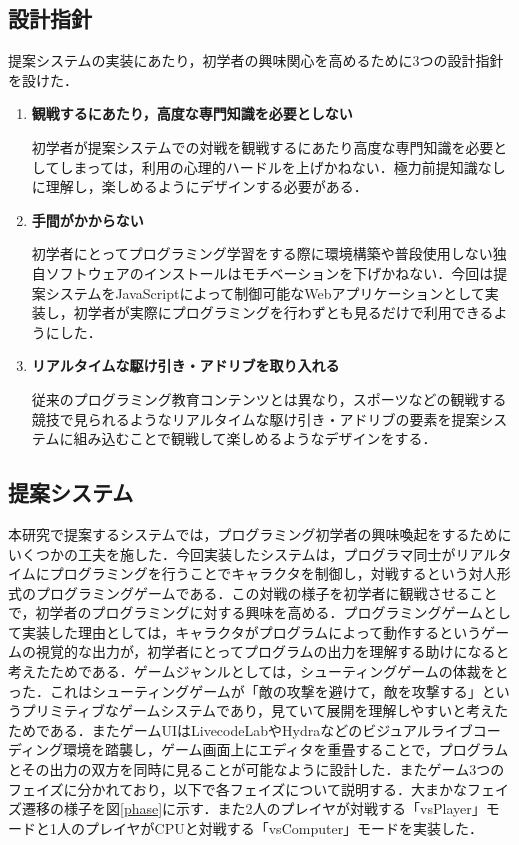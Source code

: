 \subsection{設計指針}

提案システムの実装にあたり，初学者の興味関心を高めるために3つの設計指針を設けた．

\begin{enumerate}
	\item {\bf 観戦するにあたり，高度な専門知識を必要としない}
	
	初学者が提案システムでの対戦を観戦するにあたり高度な専門知識を必要としてしまっては，利用の心理的ハードルを上げかねない．極力前提知識なしに理解し，楽しめるようにデザインする必要がある．
	
	\item {\bf 手間がかからない}

	初学者にとってプログラミング学習をする際に環境構築や普段使用しない独自ソフトウェアのインストールはモチベーションを下げかねない．今回は提案システムをJavaScriptによって制御可能なWebアプリケーションとして実装し，初学者が実際にプログラミングを行わずとも見るだけで利用できるようにした．
	
	\item {\bf リアルタイムな駆け引き・アドリブを取り入れる}

	従来のプログラミング教育コンテンツとは異なり，スポーツなどの観戦する競技で見られるようなリアルタイムな駆け引き・アドリブの要素を提案システムに組み込むことで観戦して楽しめるようなデザインをする．
\end{enumerate}

\subsection{提案システム}

本研究で提案するシステムでは，プログラミング初学者の興味喚起をするためにいくつかの工夫を施した．今回実装したシステムは，プログラマ同士がリアルタイムにプログラミングを行うことでキャラクタを制御し，対戦するという対人形式のプログラミングゲームである．この対戦の様子を初学者に観戦させることで，初学者のプログラミングに対する興味を高める．プログラミングゲームとして実装した理由としては，キャラクタがプログラムによって動作するというゲームの視覚的な出力が，初学者にとってプログラムの出力を理解する助けになると考えたためである．ゲームジャンルとしては，シューティングゲームの体裁をとった．これはシューティングゲームが「敵の攻撃を避けて，敵を攻撃する」というプリミティブなゲームシステムであり，見ていて展開を理解しやすいと考えたためである．またゲームUIはLivecodeLab\cite{livecodelab}やHydra\cite{hydra}などのビジュアルライブコーディング環境を踏襲し，ゲーム画面上にエディタを重畳することで，プログラムとその出力の双方を同時に見ることが可能なように設計した．またゲーム3つのフェイズに分かれており，以下で各フェイズについて説明する．大まかなフェイズ遷移の様子を図\ref{phase}に示す．また2人のプレイヤが対戦する「vsPlayer」モードと1人のプレイヤがCPUと対戦する「vsComputer」モードを実装した．

